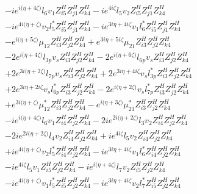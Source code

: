  \begin{align} 
 & -i e^{i \Big(\eta +4 \zeta \Big)} l_6 v_1 Z_{{i 5}}^{H} Z_{{j 1}}^{H} Z_{{k 4}}^{H} -i e^{4 i \zeta } l_5 v_2 Z_{{i 5}}^{H} Z_{{j 1}}^{H} Z_{{k 4}}^{H} \nonumber \\ 
 &-i e^{4 i \Big(\eta +\zeta \Big)} v_2 l_5^* Z_{{i 5}}^{H} Z_{{j 1}}^{H} Z_{{k 4}}^{H} -i e^{3 i \eta +4 i \zeta } v_1 l_6^* Z_{{i 5}}^{H} Z_{{j 1}}^{H} Z_{{k 4}}^{H} \nonumber \\ 
 &- e^{i \Big(\eta +5 \zeta \Big)} \mu_{12} Z_{{i 3}}^{H} Z_{{j 2}}^{H} Z_{{k 4}}^{H} +e^{3 i \eta +5 i \zeta } \mu_{21} Z_{{i 3}}^{H} Z_{{j 2}}^{H} Z_{{k 4}}^{H} \nonumber \\ 
 &-2 e^{i \Big(\eta +4 \zeta \Big)} l_{3p} v_s Z_{{i 3}}^{H} Z_{{j 2}}^{H} Z_{{k 4}}^{H} -2 e^{i \Big(\eta +6 \zeta \Big)} l_{6p} v_s Z_{{i 3}}^{H} Z_{{j 2}}^{H} Z_{{k 4}}^{H} \nonumber \\ 
 &+2 e^{3 i \Big(\eta +2 \zeta \Big)} l_{7p} v_s Z_{{i 3}}^{H} Z_{{j 2}}^{H} Z_{{k 4}}^{H} +2 e^{3 i \eta +4 i \zeta } v_s l_{3p}^* Z_{{i 3}}^{H} Z_{{j 2}}^{H} Z_{{k 4}}^{H} \nonumber \\ 
 &+2 e^{3 i \eta +2 i \zeta } v_s l_{6p}^* Z_{{i 3}}^{H} Z_{{j 2}}^{H} Z_{{k 4}}^{H} -2 e^{i \Big(\eta +2 \zeta \Big)} v_s l_{7p}^* Z_{{i 3}}^{H} Z_{{j 2}}^{H} Z_{{k 4}}^{H} \nonumber \\ 
 &+e^{3 i \Big(\eta +\zeta \Big)} \mu_{12}^* Z_{{i 3}}^{H} Z_{{j 2}}^{H} Z_{{k 4}}^{H} - e^{i \Big(\eta +3 \zeta \Big)} \mu_{21}^* Z_{{i 3}}^{H} Z_{{j 2}}^{H} Z_{{k 4}}^{H} \nonumber \\ 
 &-i e^{i \Big(\eta +4 \zeta \Big)} l_6 v_1 Z_{{i 4}}^{H} Z_{{j 2}}^{H} Z_{{k 4}}^{H} -2 i e^{2 i \Big(\eta +2 \zeta \Big)} l_3 v_2 Z_{{i 4}}^{H} Z_{{j 2}}^{H} Z_{{k 4}}^{H} \nonumber \\ 
 &-2 i e^{2 i \Big(\eta +2 \zeta \Big)} l_4 v_2 Z_{{i 4}}^{H} Z_{{j 2}}^{H} Z_{{k 4}}^{H} +i e^{4 i \zeta } l_5 v_2 Z_{{i 4}}^{H} Z_{{j 2}}^{H} Z_{{k 4}}^{H} \nonumber \\ 
 &+i e^{4 i \Big(\eta +\zeta \Big)} v_2 l_5^* Z_{{i 4}}^{H} Z_{{j 2}}^{H} Z_{{k 4}}^{H} -i e^{3 i \eta +4 i \zeta } v_1 l_6^* Z_{{i 4}}^{H} Z_{{j 2}}^{H} Z_{{k 4}}^{H} \nonumber \\ 
 &-i e^{4 i \zeta } l_5 v_1 Z_{{i 5}}^{H} Z_{{j 2}}^{H} Z_{{k 4}}^{H} -i e^{i \Big(\eta +4 \zeta \Big)} l_7 v_2 Z_{{i 5}}^{H} Z_{{j 2}}^{H} Z_{{k 4}}^{H} \nonumber \\ 
 &-i e^{4 i \Big(\eta +\zeta \Big)} v_1 l_5^* Z_{{i 5}}^{H} Z_{{j 2}}^{H} Z_{{k 4}}^{H} -i e^{3 i \eta +4 i \zeta } v_2 l_7^* Z_{{i 5}}^{H} Z_{{j 2}}^{H} Z_{{k 4}}^{H} \nonumber \\ 

\end{align}
